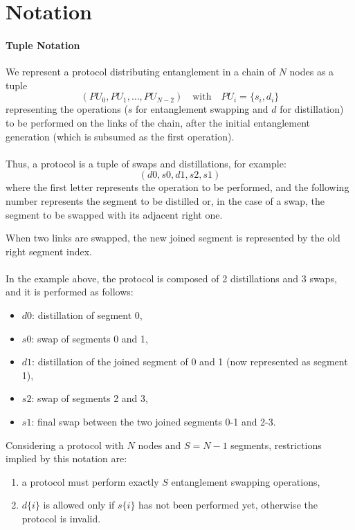 \documentclass{article}
\begin{document}
\section*{Notation}

\paragraph*{Tuple Notation}

We represent a protocol distributing entanglement in a chain of $N$ nodes as a tuple
\begin{equation*}
  (PU_0, PU_1, \ldots, PU_{N-2}) \quad \text{with} \quad PU_i = \{s_i, d_i\}
\end{equation*}
representing the operations ($s$ for entanglement swapping and $d$ for distillation) to be performed on the links of the chain, after the initial entanglement generation (which is subsumed as the first operation).
\\\\
Thus, a protocol is a tuple of swaps and distillations, for example:
\begin{equation*}
    (d0, s0, d1, s2, s1)
\end{equation*}
where the first letter represents the operation to be performed, and the following number represents the segment to be distilled or, in the case of a swap, the segment to be swapped with its adjacent right one.

When two links are swapped, the new joined segment is represented by the old right segment index.
\\\\
In the example above, the protocol is composed of 2 distillations and 3 swaps, and it is performed as follows:
\begin{itemize}
    \item $d0$: distillation of segment 0,
    \item $s0$: swap of segments 0 and 1,
    \item $d1$: distillation of the joined segment of 0 and 1 (now represented as segment 1),
    \item $s2$: swap of segments 2 and 3,
    \item $s1$: final swap between the two joined segments 0-1 and 2-3.
\end{itemize}
 
Considering a protocol with $N$ nodes and $S=N-1$ segments, restrictions implied by this notation are:
\begin{enumerate}
  \item a protocol must perform exactly $S$ entanglement swapping operations,
  \item $d\{i\}$ is allowed only if $s\{i\}$ has not been performed yet, otherwise the protocol is invalid.
\end{enumerate}
\end{document}
